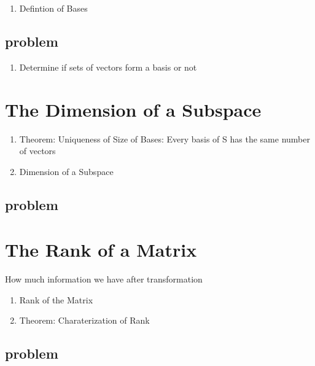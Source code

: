 \documentclass{article}
\begin{document}
\begin{enumerate}
    \item Defintion of Bases
\end{enumerate}

\subsection{problem}
\begin{enumerate}
    \item Determine if sets of vectors form a basis or not
\end{enumerate}

\section{The Dimension of a Subspace}

\begin{enumerate}
    \item Theorem: Uniqueness of Size of Bases: Every basis of S has the
	same number of vectors
    \item Dimension of a Subspace
\end{enumerate}

\subsection{problem}
\begin{enumerate}
\end{enumerate}
\section{The Rank of a Matrix}

\begin{intuition}
    How much information we have after transformation
\end{intuition}

\begin{enumerate}
    \item Rank of the Matrix
    \item Theorem: Charaterization of Rank
\end{enumerate}

\subsection{problem}
\begin{enumerate}
\end{enumerate}
\end{document}
